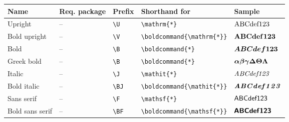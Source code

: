 \documentclass[]{article}
\begin{document}
\begin{table}[htbp]
  \hspace{-1.8cm}
  \begin{tabular}{l l l l l}
    \toprule
    Name & Req. package & Prefix & Shorthand for & Sample \\
    \midrule
    Upright & -- & \verb+\U+ & \verb+\mathrm{*}+ & $\UA\UB\UC\Ud\Ue\Uf\Uone\Utwo\Uthree$\\
    Bold upright & -- & \verb+\V+ & \verb+\boldcommand{\mathrm{*}}+ & $\VA\VB\VC\Vd\Ve\Vf\Vone\Vtwo\Vthree$ \\
    Bold & -- & \verb+\B+ & \verb+\boldcommand{*}+ & $\BA\BB\BC\Bd\Be\Bf\Bone\Btwo\Bthree$ \\
    Greek bold & -- & \verb+\B+ & \verb+\boldcommand{*}+ & $\Balpha\Bbeta\Bgamma\BDelta\BTheta\BLambda$ \\
    Italic & -- & \verb+\J+ & \verb+\mathit{*}+ & $\JA\JB\JC\Jd\Je\Jf\Jone\Jtwo\Jthree$ \\
    Bold italic & -- & \verb+\BJ+ & \verb+\boldcommand{\mathit{*}}+ & $\BJA\BJB\BJC\BJd\BJe\BJf\BJone\BJtwo\BJthree$ \\
    Sans serif & -- & \verb+\F+ & \verb+\mathsf{*}+ & $\FA\FB\FC\Fd\Fe\Ff\Fone\Ftwo\Fthree$\\
    Bold sans serif & -- & \verb+\BF+ & \verb+\boldcommand{\mathsf{*}}+ & $\BFA\BFB\BFC\BFd\BFe\BFf\BFone\BFtwo\BFthree$\\

\end{tabular}
\end{table}
\end{document}

